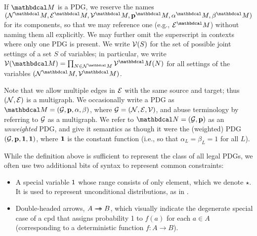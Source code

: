 \documentclass{article}
\begin{document}
	If $\dg M$ is a PDG, we reserve the names $\pdgvars[^\dg M]$
	for its components, so that we may reference one (e.g.,
	$\Ed^\dg M$) without naming them all explicitly. We may further omit the superscript in contexts where only one PDG is present. 
	We write $\mathcal V(S)$ for the set of possible joint settings of a set $S$
	of variables; in particular, 
	we write $\V(\dg M)
	= \prod_{N \in \N^\dg M} \V^\dg M(N)$
	for all settings of the variables $(\N^\dg M, \V^\dg M)$.
	
	Note that we allow multiple edges in $\mathcal E$ with the same source and
target; thus $(\mathcal N,\mathcal E)$ is a multigraph.  We occasionally write a PDG
as $\dg M = (\Gr, \mat p, \alpha,\beta)$, where $\mathcal G = (\mathcal N,\mathcal E,\mathcal V)$, and
abuse terminology by referring to $\mathcal G$ as a multigraph.
We refer to 
${\dg N} = (\Gr, \mat p)$ as an \emph{unweighted} PDG,
and give it semantics as though it were the (weighted) PDG $(\mathcal G, \mathbf p, \mathbf 1, \mathbf 1)$, where
$\bf 1$ is the constant function (i.e., so that $\alpha_L = \beta_L = 1$ for all $L$). 


While the definition above is sufficient to represent the class of all legal
PDGs, we often use two additional bits of syntax to represent common
constraints:  
    	
\begin{itemize}
    \item A special variable $\sf 1$ whose range consists of only element, which
    we denote $\star$. It is used to represent unconditional distributions, as
    in .  

	\item Double-headed arrows, $A \rightarrow\mathrel{\mspace{-15mu}}\rightarrow
      B$, which visually indicate the degenerate special
          case of a cpd that assigns probability 1 to $f(a)$
          for each $a \in A$ (corresponding to a deterministic
          function $f : A \to B$). 
\end{itemize}
\end{document}
